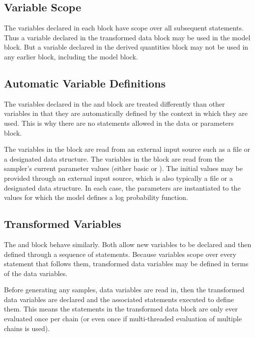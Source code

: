 \subsection{Variable Scope}

The variables declared in each block have scope over all subsequent
statements.  Thus a variable declared in the transformed data block
may be used in the model block.  But a variable declared in the
derived quantities block may not be used in any earlier block,
including the model block.

\subsection{Automatic Variable Definitions}

The variables declared in the  and  block
are treated differently than other variables in that they are
automatically defined by the context in which they are used.  This is
why there are no statements allowed in the data or parameters block.

The variables in the  block are read from an external input
source such as a file or a designated \R data structure.  The
variables in the  block are read from the sampler's
current parameter values (either basic \HMC or \NUTS).  The initial
values may be provided through an external input source, which is also
typically a file or a designated \R data structure.  In each case, the
parameters are instantiated to the values for which the model defines
a log probability function.

\subsection{Transformed Variables}

The  and  block
behave similarly.  Both allow new variables to be declared and then
defined through a sequence of statements.  Because variables scope
over every statement that follows them, transformed data variables may
be defined in terms of the data variables.  

Before generating any samples, data variables are read in, then the
transformed data variables are declared and the associated statements
executed to define them.  This means the statements in the transformed
data block are only ever evaluated once per chain (or even once if
multi-threaded evaluation of multiple chains is used).

